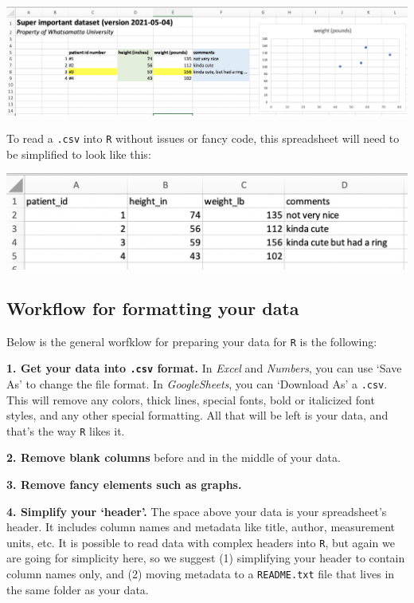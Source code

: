 \documentclass[]{book}
\begin{document}
\includegraphics{img/csv_dont.png}

To read a \texttt{.csv} into \texttt{R} without issues or fancy code, this spreadsheet will need to be simplified to look like this:

\includegraphics{img/csv_do.png}

\hypertarget{workflow-for-formatting-your-data}{%
\subsection*{Workflow for formatting your data}\label{workflow-for-formatting-your-data}}

Below is the general worfklow for preparing your data for \texttt{R} is the following:

\textbf{1. Get your data into \texttt{.csv} format.} In \emph{Excel} and \emph{Numbers}, you can use `Save As' to change the file format. In \emph{GoogleSheets}, you can `Download As' a \texttt{.csv}. This will remove any colors, thick lines, special fonts, bold or italicized font styles, and any other special formatting. All that will be left is your data, and that's the way \texttt{R} likes it.

\textbf{2. Remove blank columns} before and in the middle of your data.

\textbf{3. Remove fancy elements such as graphs.}

\textbf{4. Simplify your `header'.} The space above your data is your spreadsheet's header. It includes column names and metadata like title, author, measurement units, etc. It is possible to read data with complex headers into \texttt{R}, but again we are going for simplicity here, so we suggest (1) simplifying your header to contain column names only, and (2) moving metadata to a \texttt{README.txt} file that lives in the same folder as your data.
\end{document}
